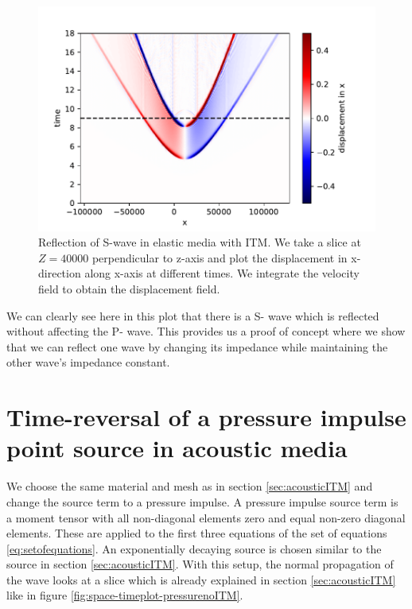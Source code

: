 \begin{figure}
    \centering
    \includegraphics[width=0.75\linewidth]{figures/swaveITMdisplacement.pdf}
    \caption{Reflection of S-wave in elastic media with \ac{ITM}. We take a slice at $Z=40000$ perpendicular to z-axis
    and plot the displacement in x-direction along x-axis at different times. We integrate the velocity field to obtain the displacement field.}
    \label{fig:space-timeplot-swavedisplacement}
\end{figure}

We can clearly see here in this plot that there is a S- wave which is reflected without affecting the P- wave. 
This provides us a proof of concept where we show that we can reflect one wave by changing its impedance while maintaining the other wave's impedance constant. \\

\section{Time-reversal of a pressure impulse point source in acoustic media}
We choose the same material and mesh as in section \ref{sec:acousticITM} and change the source term to a pressure impulse. A pressure impulse source term is a moment tensor
with all non-diagonal elements zero and equal non-zero diagonal elements. These are applied to the first three equations of the set of equations \ref{eq:setofequations}. 
An exponentially decaying source is chosen similar to the source in section \ref{sec:acousticITM}. With this setup, the normal propagation of the wave looks at a slice which is already explained in section \ref{sec:acousticITM}
like in figure \ref{fig:space-timeplot-pressurenoITM}.

